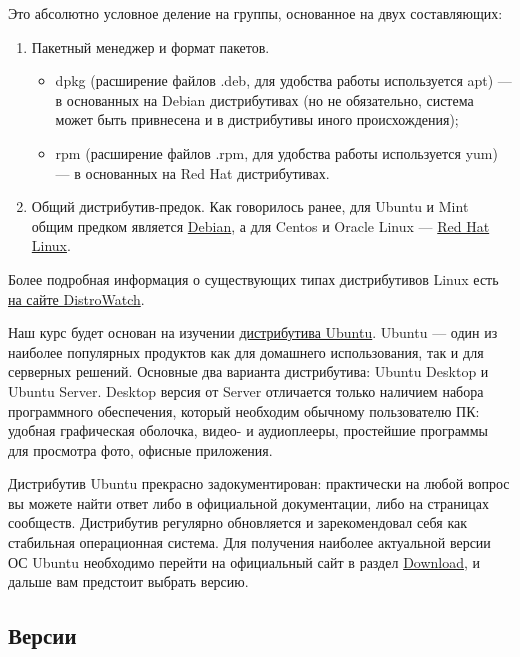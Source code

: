 \documentclass[14pt, a4paper]{article}
\begin{document}
Это абсолютно условное деление на группы, основанное на двух составляющих:

\begin{enumerate}
    \item Пакетный менеджер и формат пакетов.
    \begin{itemize}
        \item dpkg (расширение файлов .deb, для удобства работы используется apt) — в
        основанных на Debian дистрибутивах (но не обязательно, система может быть
        привнесена и в дистрибутивы иного происхождения);
        \item rpm (расширение файлов .rpm, для удобства работы используется yum) — в
        основанных на Red Hat дистрибутивах.
    \end{itemize}
    \item Общий дистрибутив-предок. Как говорилось ранее, для Ubuntu и Mint общим предком является
    \href{https://www.debian.org/}{Debian}, а для Centos и Oracle Linux — \href{https://www.redhat.com/en}{Red Hat Linux}.
\end{enumerate}

Более подробная информация о существующих типах дистрибутивов Linux есть \href{https://distrowatch.com/}{на сайте
DistroWatch}.

Наш курс будет основан на изучении \href{https://ubuntu.com/}{дистрибутива Ubuntu}. Ubuntu — один из наиболее
популярных продуктов как для домашнего использования, так и для серверных решений. Основные
два варианта дистрибутива: Ubuntu Desktop и Ubuntu Server. Desktop версия от Server отличается
только наличием набора программного обеспечения, который необходим обычному пользователю ПК:
удобная графическая оболочка, видео- и аудиоплееры, простейшие программы для просмотра фото,
офисные приложения.

Дистрибутив Ubuntu прекрасно задокументирован: практически на любой вопрос вы можете
найти ответ либо в официальной документации, либо на страницах сообществ. Дистрибутив
регулярно обновляется и зарекомендовал себя как стабильная операционная система. Для получения
наиболее актуальной версии ОС Ubuntu необходимо перейти на официальный сайт в раздел
\href{https://ubuntu.com/#download}{Download}, и дальше вам предстоит выбрать версию.

\subsection*{Версии}
\end{document}
